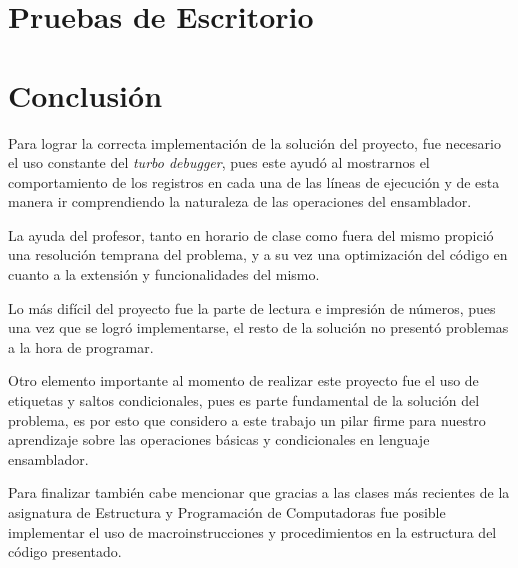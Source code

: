 \documentclass[letter,12 pt,titlepage]{article}
\begin{document}
    \section{Pruebas de Escritorio}

    \section{Conclusión}

    Para lograr la correcta implementación de la solución del proyecto, fue necesario el uso constante del \textit{turbo debugger}, pues este ayudó al mostrarnos el comportamiento de los registros en cada una de las líneas de ejecución y de esta manera ir comprendiendo la naturaleza de las operaciones del ensamblador.

    La ayuda del profesor, tanto en horario de clase como fuera del mismo propició una resolución temprana del problema, y a su vez una optimización del código en cuanto a la extensión y funcionalidades del mismo.

    Lo más difícil del proyecto fue la parte de lectura e impresión de números, pues una vez que se logró implementarse, el resto de la solución no presentó problemas a la hora de programar.

    Otro elemento importante al momento de realizar este proyecto fue el uso de etiquetas y saltos condicionales, pues es parte fundamental de la solución del problema, es por esto que considero a este trabajo un pilar firme para nuestro aprendizaje sobre las operaciones básicas y condicionales en lenguaje ensamblador.

    Para finalizar también cabe mencionar que gracias a las clases más recientes de la asignatura de Estructura y Programación de Computadoras fue posible implementar el uso de macroinstrucciones y procedimientos en la estructura del código presentado.
\end{document}
